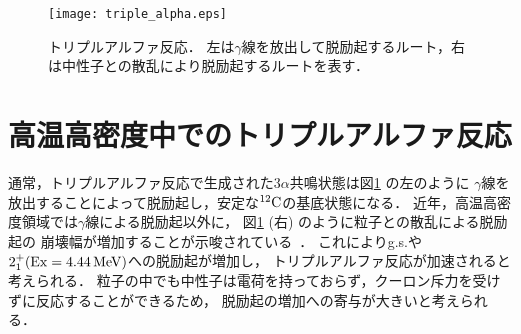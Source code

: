 \documentclass[../master]{subfiles}
\begin{document}
\begin{figure}
  \centering
  \texttt{[image: triple\_alpha.eps]}
  \caption[トリプルアルファ反応．]{トリプルアルファ反応．
    左は$\gamma$線を放出して脱励起するルート，右は中性子との散乱により脱励起するルートを表す．}
  \label{fig::triple_alpha}
\end{figure}

\section{高温高密度中でのトリプルアルファ反応}
\label{seq::triplealphareaction}
通常，トリプルアルファ反応で生成された$3\alpha$共鳴状態は図\ref{fig::triple_alpha} の左のように
$\gamma$線を放出することによって脱励起し，安定な${}^{12}{\rm C}$の基底状態になる．
近年，高温高密度領域では$\gamma$線による脱励起以外に，
図\ref{fig::triple_alpha} (右) のように粒子との散乱による脱励起の
崩壊幅が増加することが示唆されている~\cite{hotdensemedium}．
これによりg.s.や$2_{1}^{+} ({\rm Ex} = \SIU{4.44}{\mega\electronvolt}) $への脱励起が増加し，
トリプルアルファ反応が加速されると考えられる．
粒子の中でも中性子は電荷を持っておらず，クーロン斥力を受けずに反応することができるため，
脱励起の増加への寄与が大きいと考えられる．


\end{document}
